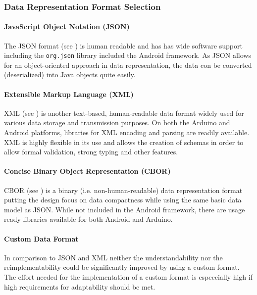 \subsubsection{Data Representation Format Selection}
\paragraph{JavaScript Object Notation (JSON)}
The JSON format (see \cite{ECMA-404}) is human readable and has has wide software support including the \texttt{org.json} library included the Android framework. As JSON allows for an object-oriented approach in data representation, the data con be converted (deserialized) into Java objects quite easily.

\paragraph{Extensible Markup Language (XML)}
XML (see \cite{XML}) is another text-based, human-readable data format widely used for various data storage and transmission purposes. On both the Arduino and Android platforms, libraries for XML encoding and parsing are readily available. XML is highly flexible in its use and allows the creation of schemas in order to allow formal validation, strong typing and other features. 

\paragraph{Concise Binary Object Representation (CBOR)}
CBOR (see \cite{CBOR}) is a binary (i.e. non-human-readable) data representation format putting the design focus on data compactness while using the same basic data model as JSON. While not included in the Android framework, there are usage ready libraries available for both Android and Arduino.

\paragraph{Custom Data Format}
In comparison to JSON and XML neither the understandability nor the reimplementability could be significantly improved by using a custom format. The effort needed for the implementation of a custom format is especcially high if high requirements for adaptability should be met.

